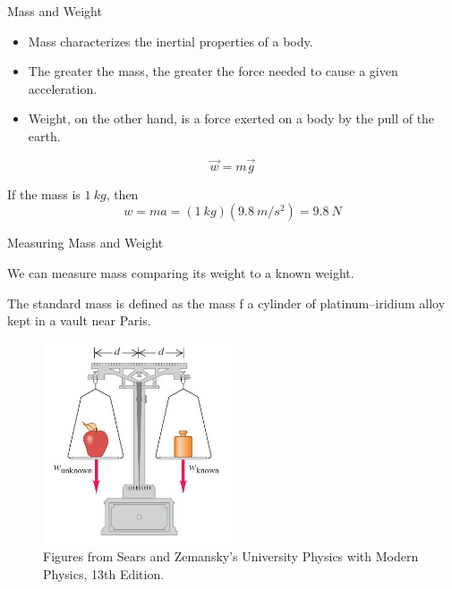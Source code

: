 \documentclass[]{beamer}
\begin{document}
\begin{frame}

 Mass and Weight
 \vspace{5mm}

\begin{itemize}
  \item  Mass characterizes the inertial properties of a body.
  \item The greater the mass, the greater the force needed to cause a given acceleration.
  \item Weight, on the other hand, is a force exerted on a body by the pull of the earth.
\end{itemize}
  

\begin{equation}
  \vec{w}=m\vec{g}
\end{equation}

If the mass is $1~kg$, then
\begin{equation}
  w=ma=(1~kg)(9.8~m/s^2)=9.8~N
\end{equation}
  
  \end{frame}



\begin{frame}
  Measuring Mass and Weight
  \vspace{5mm}

We can measure mass comparing its weight to a known weight.


The standard mass is defined as the mass  f a cylinder of platinum–iridium alloy 
kept in a vault near Paris.




\begin{figure}[h!]  
  \includegraphics[width=0.5\textwidth]{images/f11.jpg}
  \caption{ {\tiny Figures from Sears and Zemansky's University Physics 
  with Modern Physics, 13th Edition.} }
\end{figure}




  \end{frame}
\end{document}

